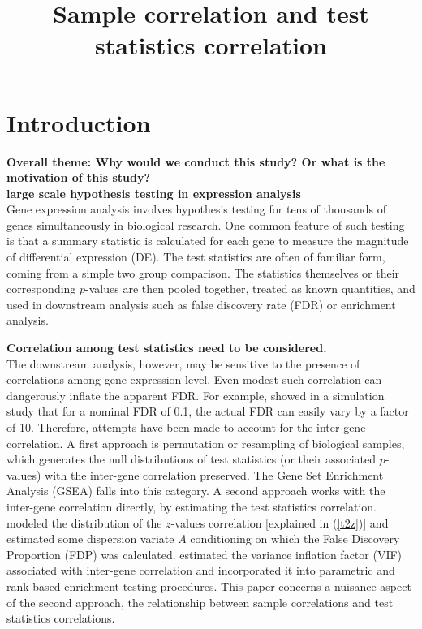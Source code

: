 \documentclass[11pt, a4paper]{article}
\title{Sample correlation and test statistics correlation}
\date{} %
\begin{document}
\maketitle
\section{Introduction}
\textbf{Overall theme: Why would we conduct this study? Or what is the motivation of this study?} \\

\textbf{large scale hypothesis testing in expression analysis}\\
Gene expression analysis involves hypothesis testing for tens of thousands of genes simultaneously in biological research. One common feature of such  testing is that a summary statistic is calculated for each gene to measure the magnitude of differential expression (DE). The test statistics are often of familiar form, coming from a simple two group comparison. The statistics themselves or their corresponding $p$-values are then pooled together, treated as known quantities, and used in downstream analysis such as false discovery rate (FDR) or enrichment analysis.  

\textbf{Correlation among test statistics need to be considered.} \\
The downstream analysis, however, may be sensitive to the presence of correlations among gene expression level. Even modest such correlation can dangerously inflate the apparent FDR. For example, \cite{efron2007correlation} showed in a simulation study that for a nominal FDR of 0.1, the actual FDR can easily vary by a factor of 10. Therefore, attempts  have been made to account for the inter-gene correlation. A first approach is permutation or resampling of biological samples, which generates the null distributions of test statistics (or their associated $p$-values) with the inter-gene correlation preserved. The Gene Set Enrichment Analysis (GSEA) \citep{subramanian2005gene} falls into this category. A second approach works with the inter-gene correlation directly, by estimating the test statistics correlation. \cite{efron2007correlation} modeled the distribution of the $z$-values correlation [explained in (\ref{t2z})] and estimated some dispersion variate $A$ conditioning on which the False Discovery Proportion (FDP) was calculated. \cite{wu2012camera} estimated the variance inflation factor (VIF) associated with inter-gene correlation and incorporated it into parametric and rank-based enrichment testing procedures. This paper concerns a nuisance aspect of the second approach, the relationship between sample correlations and test statistics correlations. 
\end{document}
